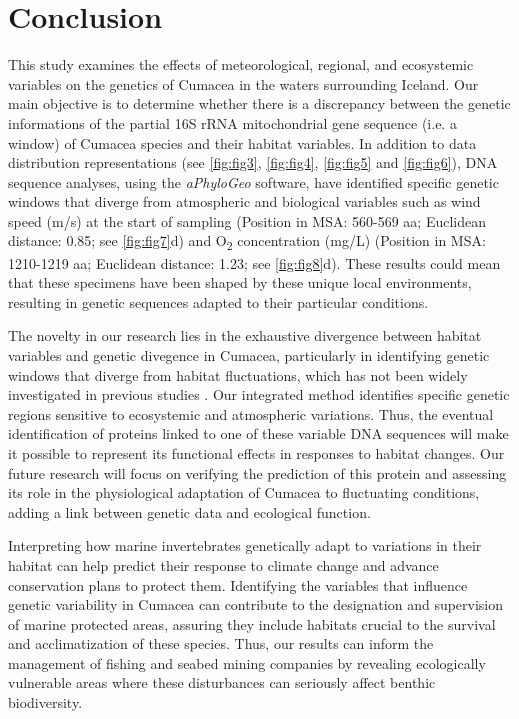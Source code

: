 \section{Conclusion}\label{conclusion}
This study examines the effects of meteorological, regional, and ecosystemic variables on the genetics of Cumacea in the waters surrounding Iceland. Our main objective is to determine whether there is a discrepancy between the genetic informations of the partial 16S rRNA mitochondrial gene sequence (i.e. a window) of Cumacea species and their habitat variables. In addition to data distribution representations (see \autoref{fig:fig3}, \autoref{fig:fig4}, \autoref{fig:fig5} and \autoref{fig:fig6}), DNA sequence analyses, using the \textit{aPhyloGeo} software, have identified specific genetic windows that diverge from atmospheric and biological variables such as wind speed (m/s) at the start of sampling (Position in MSA: 560-569 aa; Euclidean distance: 0.85; see \autoref{fig:fig7}d) and O\textsubscript{2} concentration (mg/L) (Position in MSA: 1210-1219 aa; Euclidean distance: 1.23; see \autoref{fig:fig8}d). These results could mean that these specimens have been shaped by these unique local environments, resulting in genetic sequences adapted to their particular conditions.

The novelty in our research lies in the exhaustive divergence between habitat variables and genetic divegence in Cumacea, particularly in identifying genetic windows that diverge from habitat fluctuations, which has not been widely investigated in previous studies \citep{manel2003landscape, vrijenhoek2009cryptic}. Our integrated method identifies specific genetic regions sensitive to ecosystemic and atmospheric variations. Thus, the eventual identification of proteins linked to one of these variable DNA sequences will make it possible to represent its functional effects in responses to habitat changes. Our future research will focus on verifying the prediction of this protein and assessing its role in the physiological adaptation of Cumacea to fluctuating conditions, adding a link between genetic data and ecological function.

Interpreting how marine invertebrates genetically adapt to variations in their habitat can help predict their response to climate change and advance conservation plans to protect them. Identifying the variables that influence genetic variability in Cumacea can contribute to the designation and supervision of marine protected areas, assuring they include habitats crucial to the survival and acclimatization of these species. Thus, our results can inform the management of fishing and seabed mining companies by revealing ecologically vulnerable areas where these disturbances can seriously affect benthic biodiversity.

